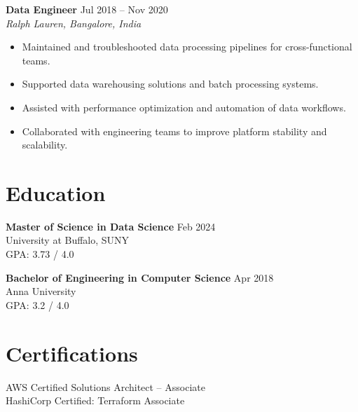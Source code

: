 \documentclass[10pt]{article}
\begin{document}
\textbf{Data Engineer} \hfill Jul 2018 -- Nov 2020 \\
\textit{Ralph Lauren, Bangalore, India}
\begin{itemize}[leftmargin=*, itemsep=3pt]
    \item Maintained and troubleshooted data processing pipelines for cross-functional teams.
    \item Supported data warehousing solutions and batch processing systems.
    \item Assisted with performance optimization and automation of data workflows.
    \item Collaborated with engineering teams to improve platform stability and scalability.
\end{itemize}

\section*{Education}

\textbf{Master of Science in Data Science} \hfill Feb 2024 \\
University at Buffalo, SUNY \\
GPA: 3.73 / 4.0

\textbf{Bachelor of Engineering in Computer Science} \hfill Apr 2018 \\
Anna University \\
GPA: 3.2 / 4.0

\section*{Certifications}
AWS Certified Solutions Architect – Associate \\
HashiCorp Certified: Terraform Associate
\end{document}
